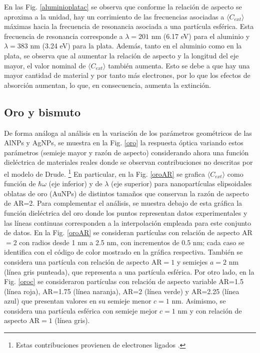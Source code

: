  En las Fig. \ref{aluminioplatac} se observa que conforme la relación de aspecto se aproxima a la unidad, hay un corrimiento de las frecuencias asociadas a $\langle C_{ext}\rangle$ máximas hacia la frecuencia de resonancia asociada a una partícula esférica. Esta frecuencia de resonancia corresponde a $\lambda=201\text{ nm}$ (6.17 eV) para el aluminio y $\lambda=383\text{ nm}$ (3.24 eV) para la plata. Además, tanto en el aluminio como en la plata, se observa que al aumentar la relación de aspecto y la longitud del eje mayor, el valor nominal de  $\langle C_{ext}\rangle$ también aumenta. Esto se debe a que hay una mayor cantidad de material y por tanto más electrones, por lo que los efectos de absorción aumentan, lo que, en consecuencia, aumenta la extinción.



\subsection*{Oro y bismuto}
De forma análoga al análisis en la variación de los parámetros geométricos de las AlNPs y AgNPs, se muestra en la Fig. \ref{oro} la respuesta óptica variando estos parámetros (semieje mayor y razón de aspecto) considerando ahora una función dieléctrica de materiales reales donde se observan contribuciones no descritas por el modelo de Drude. \footnote{Estas contribuciones provienen de electrones ligados \cite{Plasmonics}.} En particular, en la Fig. \ref{oroAR} se grafica $\langle C_{ext}\rangle$ como función de $\hbar\omega$ (eje inferior) y de $\lambda$ (eje superior) para nanopartículas elipsoidales oblatas de oro (AuNPs) de distintos tamaños que conservan la razón de aspecto de AR=2. Para complementar el análisis, se muestra debajo de esta gráfica la función dieléctrica del oro donde los puntos representan datos experimentales \cite{Plata} y las líneas continuas corresponden a la interpolación empleada para este conjunto de datos. En la Fig. \ref{oroAR} se consideran partículas con relación de aspecto AR$=2$ con radios desde 1  nm a 2.5 nm, con incrementos de 0.5 nm; cada caso se identifica con el código de color mostrado en la gráfica respectiva. También se considera una partícula con relación de aspecto AR$=1$ y semiejes $a=2$ nm (línea gris punteada), que representa a una partícula esférica. Por otro lado, en la Fig. \ref{oroc} se consideraron partículas con relación de aspecto variable AR=1.5 (línea roja), AR=1.75 (línea naranja), AR=2 (línea verde) y AR=2.25 (línea azul) que presentan valores en su semieje menor $c=1\text{ nm}$. Asimismo, se considera una partícula esférica con semieje mejor $c=1\text{ nm}$ y con relación de aspecto AR$=1$ (línea gris).
